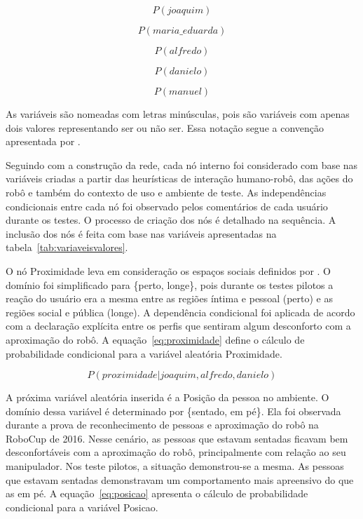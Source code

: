 \begin{equation}
	\label{eq:joaquim}
	P(joaquim)
\end{equation}

\begin{equation}
	\label{eq:mariaeduarda}
	P(maria\_eduarda)
\end{equation}

\begin{equation}
	\label{eq:alfredo}
	P(alfredo)
\end{equation}

\begin{equation}
	\label{eq:danielo}
	P(danielo)
\end{equation}

\begin{equation}
	\label{eq:manuel}
	P(manuel)
\end{equation}

As variáveis são nomeadas com letras minúsculas, pois são variáveis com apenas dois valores representando ser ou não ser. Essa notação segue a convenção apresentada por .

Seguindo com a construção da rede, cada nó interno foi considerado com base nas variáveis criadas a partir das heurísticas de interação humano-robô, das ações do robô e também do contexto de uso e ambiente de teste. As independências condicionais entre cada nó foi observado pelos comentários de cada usuário durante os testes. O processo de criação dos nós é detalhado na sequência. A inclusão dos nós é feita com base nas variáveis apresentadas na tabela~\ref{tab:variaveisvalores}.

O nó Proximidade leva em consideração os espaços sociais definidos por . O domínio foi simplificado para \{perto, longe\}, pois durante os testes pilotos a reação do usuário era a mesma entre as regiões íntima e pessoal (perto) e as regiões social e pública (longe). A dependência condicional foi aplicada de acordo com a declaração explícita entre os perfis que sentiram algum desconforto com a aproximação do robô. A equação~\ref{eq:proximidade} define o cálculo de probabilidade condicional para a variável aleatória Proximidade.

\begin{equation}
	\label{eq:proximidade}
	P(proximidade | joaquim, alfredo, danielo)
\end{equation}

A próxima variável aleatória inserida é a Posição da pessoa no ambiente. O domínio dessa variável é determinado por \{sentado, em pé\}. Ela foi observada durante a prova de reconhecimento de pessoas e aproximação do robô na RoboCup de 2016. Nesse cenário, as pessoas que estavam sentadas ficavam bem desconfortáveis com a aproximação do robô, principalmente com relação ao seu manipulador. Nos teste pilotos, a situação demonstrou-se a mesma. As pessoas que estavam sentadas demonstravam um comportamento mais apreensivo do que as em pé. A equação~\ref{eq:posicao} apresenta o cálculo de probabilidade condicional para a variável Posicao.

